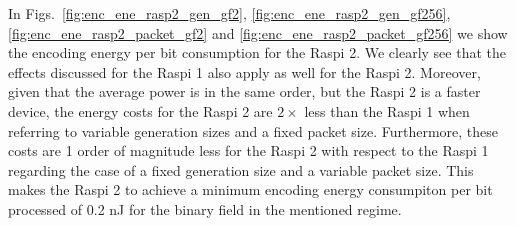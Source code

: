 %
In Figs.~\ref{fig:enc_ene_rasp2_gen_gf2}, \ref{fig:enc_ene_rasp2_gen_gf256},
\ref{fig:enc_ene_rasp2_packet_gf2} and \ref{fig:enc_ene_rasp2_packet_gf256} 
we show the encoding energy per bit consumption for the \ac{Raspi} 2.
We clearly see that the effects discussed for the \ac{Raspi} 1 also apply
as well for the \ac{Raspi} 2. Moreover, given that the average power
is in the same order, but the \ac{Raspi} 2 is a faster device,
the energy costs for the \ac{Raspi} 2 are $2\times$ less than the \ac{Raspi} 1
when referring to variable generation sizes and a fixed packet size.
Furthermore, these costs are 1 order of magnitude less for the \ac{Raspi} 2
with respect to the \ac{Raspi} 1 regarding the case of a fixed generation
size and a variable packet size. This makes the \ac{Raspi} 2 to achieve
a minimum encoding energy consumpiton per bit processed of 0.2 nJ for the
binary field in the mentioned regime.


